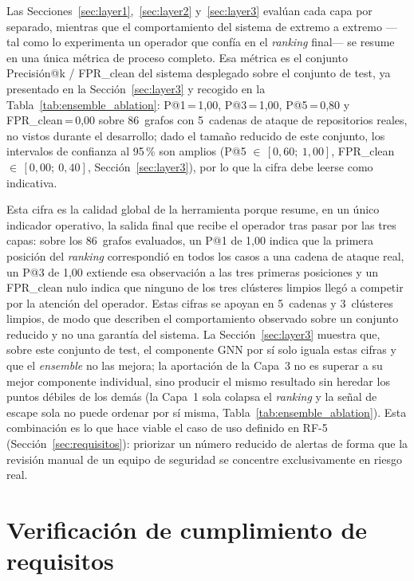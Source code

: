 Las Secciones~\ref{sec:layer1},~\ref{sec:layer2} y~\ref{sec:layer3} evalúan cada
capa por separado, mientras que el comportamiento del sistema de extremo a
extremo —tal como lo experimenta un operador que confía en el \textit{ranking}
final— se resume en una única métrica de proceso completo. Esa
métrica es el conjunto Precisión@k / \ac{FPR}\_clean del sistema desplegado sobre
el conjunto de test, ya presentado en la Sección~\ref{sec:layer3} y recogido en
la Tabla~\ref{tab:ensemble_ablation}: P@1\,=\,1,00, P@3\,=\,1,00, P@5\,=\,0,80 y
\ac{FPR}\_clean\,=\,0,00 sobre 86~grafos con 5~cadenas de ataque de repositorios
reales, no vistos durante el desarrollo; dado el tamaño reducido de
este conjunto, los intervalos de confianza al 95\,\% son amplios (P@5
\(\in\,[0{,}60;\ 1{,}00]\), \ac{FPR}\_clean \(\in\,[0{,}00;\ 0{,}40]\),
Sección~\ref{sec:layer3}), por lo que la cifra debe leerse como indicativa.

Esta cifra es la calidad global de la herramienta porque resume, en un único
indicador operativo, la salida final que recibe el operador tras pasar por las
tres capas: sobre los 86~grafos evaluados, un P@1 de 1,00 indica que la primera
posición del \textit{ranking} correspondió en todos los casos a una cadena de
ataque real, un P@3 de 1,00 extiende esa observación a las tres primeras
posiciones y un \ac{FPR}\_clean nulo indica que ninguno de los tres clústeres
limpios llegó a competir por la atención del operador. Estas cifras se apoyan en
5~cadenas y 3~clústeres limpios, de modo que describen el comportamiento
observado sobre un conjunto reducido y no una garantía del sistema. La
Sección~\ref{sec:layer3} muestra que, sobre este
conjunto de test, el componente \ac{GNN} por sí solo iguala estas cifras y que
el \textit{ensemble} no las mejora; la aportación de la Capa~3 no es superar a
su mejor componente individual, sino producir el mismo resultado sin heredar los
puntos débiles de los demás (la Capa~1 sola colapsa el \textit{ranking} y la señal de
escape sola no puede ordenar por sí misma, Tabla~\ref{tab:ensemble_ablation}).
Esta combinación es lo que hace viable el caso de uso definido en RF-5
(Sección~\ref{sec:requisitos}): priorizar un número reducido de alertas de forma
que la revisión manual de un equipo de seguridad se concentre exclusivamente en
riesgo real.

\section{Verificación de cumplimiento de requisitos}
\label{sec:verificacion_requisitos}

